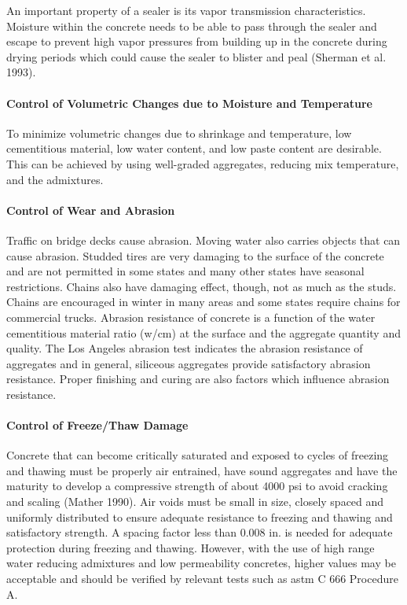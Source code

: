 An important property of a sealer is its vapor transmission characteristics. Moisture within the concrete needs to
be able to pass through the sealer and escape to prevent high vapor pressures from building up in the concrete during
drying periods which could cause the sealer to blister and peal (Sherman et al. 1993).

\paragraph{Control of Volumetric Changes due to Moisture and Temperature}
To minimize volumetric changes due to shrinkage and temperature, low cementitious material, low water
content, and low paste content are desirable. This can be achieved by using well-graded aggregates, reducing mix
temperature, and the admixtures.


\paragraph{Control of Wear and Abrasion}
Traffic on bridge decks cause abrasion. Moving water also carries objects that can cause abrasion. Studded tires
are very damaging to the surface of the concrete and are not permitted in some states and many other states have
seasonal restrictions. Chains also have damaging effect, though, not as much as the studs. Chains are encouraged in
winter in many areas and some states require chains for commercial trucks. Abrasion resistance of concrete is a
function of the water cementitious material ratio (w/cm) at the surface and the aggregate quantity and quality. The
Los Angeles abrasion test indicates the abrasion resistance of aggregates and in general, siliceous aggregates provide
satisfactory abrasion resistance. Proper finishing and curing are also factors which influence abrasion resistance.



\paragraph{Control of Freeze/Thaw Damage}
Concrete that can become critically saturated and exposed to cycles of freezing and thawing must be properly air
entrained, have sound aggregates and have the maturity to develop a compressive strength of about 4000 psi to avoid
cracking and scaling (Mather 1990). Air voids must be small in size, closely spaced and uniformly distributed to
ensure adequate resistance to freezing and thawing and satisfactory strength. A spacing factor less than 0.008 in. is needed for adequate protection during freezing and thawing. However, with the use of high range water reducing
admixtures and low permeability concretes, higher values may be acceptable and should be verified by relevant tests
such as \acrshort*{astm} C 666 Procedure A.

